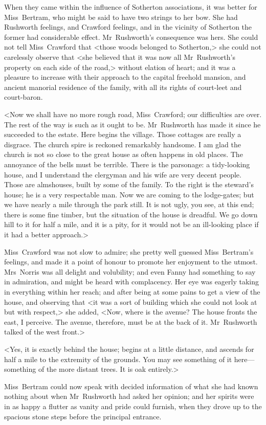 When they came within the influence of Sotherton associations, it was better for Miss~Bertram, who might be said to have two strings to her bow. She had Rushworth feelings, and Crawford feelings, and in the vicinity of Sotherton the former had considerable effect. Mr~Rushworth's consequence was hers. She could not tell Miss~Crawford that <those woods belonged to Sotherton,> she could not carelessly observe that <she believed that it was now all Mr~Rushworth's property on each side of the road,> without elation of heart; and it was a pleasure to increase with their approach to the capital freehold mansion, and ancient manorial residence of the family, with all its rights of court-leet and court-baron.

<Now we shall have no more rough road, Miss~Crawford; our difficulties are over. The rest of the way is such as it ought to be. Mr~Rushworth has made it since he succeeded to the estate. Here begins the village. Those cottages are really a disgrace. The church spire is reckoned remarkably handsome. I am glad the church is not so close to the great house as often happens in old places. The annoyance of the bells must be terrible. There is the parsonage: a tidy-looking house, and I understand the clergyman and his wife are very decent people. Those are almshouses, built by some of the family. To the right is the steward's house; he is a very respectable man. Now we are coming to the lodge-gates; but we have nearly a mile through the park still. It is not ugly, you see, at this end; there is some fine timber, but the situation of the house is dreadful. We go down hill to it for half a mile, and it is a pity, for it would not be an ill-looking place if it had a better approach.>

Miss~Crawford was not slow to admire; she pretty well guessed Miss~Bertram's feelings, and made it a point of honour to promote her enjoyment to the utmost. Mrs~Norris was all delight and volubility; and even Fanny had something to say in admiration, and might be heard with complacency. Her eye was eagerly taking in everything within her reach; and after being at some pains to get a view of the house, and observing that <it was a sort of building which she could not look at but with respect,> she added, <Now, where is the avenue? The house fronts the east, I perceive. The avenue, therefore, must be at the back of it. Mr~Rushworth talked of the west front.>

<Yes, it is exactly behind the house; begins at a little distance, and ascends for half a mile to the extremity of the grounds. You may see something of it here—something of the more distant trees. It is oak entirely.>

Miss~Bertram could now speak with decided information of what she had known nothing about when Mr~Rushworth had asked her opinion; and her spirits were in as happy a flutter as vanity and pride could furnish, when they drove up to the spacious stone steps before the principal entrance. 